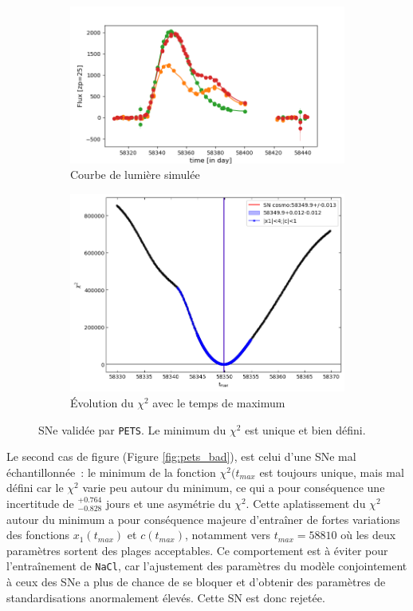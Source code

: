 \documentclass{book}
\def\pets{\texttt{PETS}\xspace}
\def\nacl{\texttt{NaCl}\xspace}
\begin{document}
\begin{figure}
	\begin{subfigure}{0.45\textwidth}
		\centering
		\includegraphics[width=\textwidth]{figures/276_lc_truth.png}
		\caption{Courbe de lumière simulée}
	\end{subfigure}
	\hfill
	\begin{subfigure}{0.45\textwidth}
		\centering
		\includegraphics[width=\textwidth]{figures/276_Tmaxgrid.png}
		\caption{Évolution du $\chi^2$ avec le temps de maximum}
	\end{subfigure}
	\caption{SNe validée par \pets. Le minimum du $\chi^2$ est unique et bien défini.}
	\label{fig:pets_good}
\end{figure}
 
Le second cas de figure (Figure \ref{fig:pets_bad}), est celui d'une SNe mal échantillonnée~: le minimum de la fonction $\chi^2(t_{max}$ est toujours unique, mais mal défini car le $\chi^2$ varie peu autour du minimum, ce qui a pour conséquence une incertitude de $^{+0.764}_{-0.828}$ jours et une asymétrie du $\chi^2$. Cette aplatissement du $\chi^2$ autour du minimum a pour conséquence majeure d'entraîner de fortes variations des fonctions $x_1(t_{max})$ et $c(t_{max})$, notamment vers $t_{max}=58 810$ où les deux paramètres sortent des plages acceptables. Ce comportement est à éviter pour l'entraînement de \nacl, car l'ajustement des paramètres du modèle conjointement à ceux des SNe a plus de chance de se bloquer et d'obtenir des paramètres de standardisations anormalement élevés. Cette SN est donc rejetée.
\end{document}
